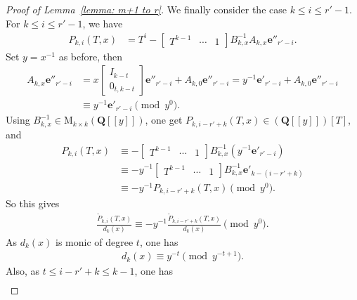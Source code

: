 \documentclass[11pt]{amsart}
\theoremstyle{definition}
\numberwithin{equation}{subsection}
\theoremstyle{plain}
\theoremstyle{plain}
\theoremstyle{plain}
\theoremstyle{plain}
\theoremstyle{plain}
\theoremstyle{plain}
\theoremstyle{plain}
\theoremstyle{plain}
\theoremstyle{plain}
\theoremstyle{plain}
\theoremstyle{plain}
\theoremstyle{plain}
\theoremstyle{definition}
\theoremstyle{definition}
\theoremstyle{definition}
\theoremstyle{remark}
\renewcommand{\(}{\textup{(}}
\renewcommand{\)}{\textup{)}}
\newcommand{\M}{\mathrm{M}}
\newcommand{\Q}{\mathbf{Q}}
\begin{document}
\begin{proof}[Proof of Lemma~\ref{lemma: m+1 to r}]
We finally consider the case $k\leq i\leq r'-1$. For $k\leq i\leq r'-1$, we have
    \begin{align*}
        P_{k,i}(T,x)
        &=
        T^i
        -
        \begin{bmatrix}
            T^{k-1} & \cdots & 1
        \end{bmatrix}
        B_{k,x}^{-1}A_{k,x}
        \mathbf{e}''_{r'-i}.
    \end{align*}
Set $y=x^{-1}$ as before, then
    \begin{align*}
        A_{k,x}\mathbf{e}''_{r'-i}
        &=
        x
        \begin{bmatrix}
           I_{k-t} \\
           0_{t,k-t}
        \end{bmatrix}
        \mathbf{e}''_{r'-i}
        +
        A_{k,0}\mathbf{e}''_{r'-i}
        =
        y^{-1}\mathbf{e}'_{r'-i}
        +A_{k,0}\mathbf{e}''_{r'-i}
        \\
        &\equiv
        y^{-1}\mathbf{e}'_{r'-i}
        \pmod{y^0}.
    \end{align*}
Using $B_{k,x}^{-1}\in \M_{k\times k}(\Q[[y]])$, one get $P_{k,i-r'+k}(T,x)\in (\Q[[y]])[T]$, and
    \begin{align*}
        P_{k,i}(T,x)
        &\equiv
        -
        \begin{bmatrix}
            T^{k-1} & \cdots & 1
        \end{bmatrix}
        B_{k,x}^{-1}(y^{-1}\mathbf{e}'_{r'-i})
        \\
        &\equiv
        -y^{-1}
        \begin{bmatrix}
            T^{k-1} & \cdots & 1
        \end{bmatrix}
        B_{k,x}^{-1}\mathbf{e}'_{k-(i-r'+k)}
        \\
        &\equiv
        -y^{-1}P_{k,i-r'+k}(T,x)
        \pmod{y^0}.
    \end{align*}
So this gives
    \begin{align*}
        \frac{\tilde P_{k,i}(T,x)}{d_k(x)}
        \equiv
        -y^{-1}\frac{\tilde P_{k,i-r'+k}(T,x)}{d_k(x)}
        \pmod{y^0}.
    \end{align*}
As $d_k(x)$ is monic of degree $t$, one has
    \begin{align*}
        d_k(x)
        \equiv
        y^{-t} \pmod{y^{-t+1}}.
    \end{align*}
Also, as $t\leq i-r'+k\leq k-1$, one has
    \begin{align*}

\end{align*}
\end{proof}
\end{document}
